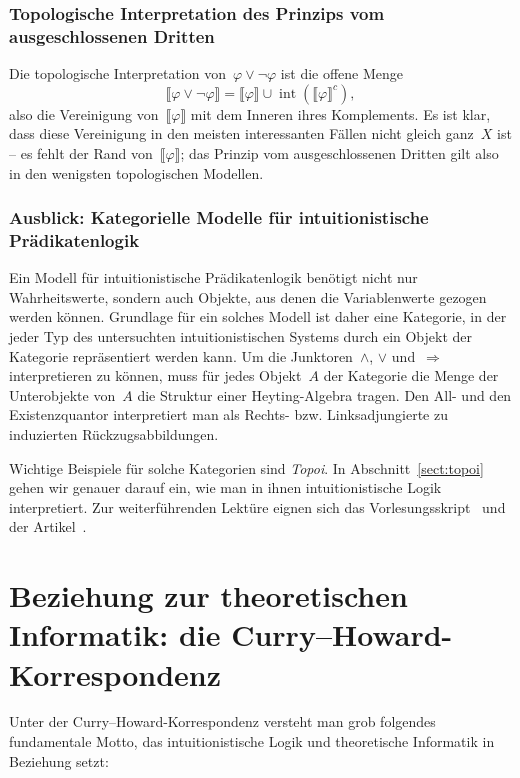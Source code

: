 \documentclass[a4paper,ngerman,12pt]{scrartcl}
\theoremstyle{definition}
\theoremstyle{plain}
\theoremstyle{remark}
\newcommand{\brak}[1]{\llbracket {#1} \rrbracket}
\DeclareMathOperator{\interior}{int}
\renewcommand{\_}{\mathpunct{.}\,}
\newcommand{\?}{\,{:}\,}
\begin{document}
\subsubsection*{Topologische Interpretation des Prinzips vom ausgeschlossenen
Dritten}

Die topologische Interpretation von~$\varphi \vee \neg\varphi$ ist die offene
Menge
\[ \brak{\varphi \vee \neg\varphi} = \brak{\varphi} \cup \interior
(\brak{\varphi}^c), \]
also die Vereinigung von~$\brak{\varphi}$ mit dem Inneren ihres Komplements. Es
ist klar, dass diese Vereinigung in den meisten interessanten Fällen nicht
gleich ganz~$X$ ist -- es fehlt der Rand von~$\brak{\varphi}$; das Prinzip vom
ausgeschlossenen Dritten gilt also in den
wenigsten topologischen Modellen.


\subsubsection*{Ausblick: Kategorielle Modelle für intuitionistische Prädikatenlogik}

Ein Modell für intuitionistische Prädikatenlogik benötigt nicht nur
Wahrheitswerte, sondern auch Objekte, aus denen die Variablenwerte gezogen
werden können. Grundlage für ein solches Modell ist daher eine Kategorie, in der
jeder Typ des untersuchten intuitionistischen Systems durch ein Objekt der
Kategorie repräsentiert werden kann. Um die Junktoren~$\wedge$, $\vee$
und~$\Rightarrow$ interpretieren zu können, muss für jedes Objekt~$A$ der
Kategorie die Menge der Unterobjekte von~$A$ die Struktur einer Heyting-Algebra
tragen. Den All- und den Existenzquantor interpretiert man als Rechts-
bzw. Linksadjungierte zu induzierten Rückzugsabbildungen.

Wichtige Beispiele für solche Kategorien sind \emph{Topoi}. In
Abschnitt~\ref{sect:topoi} gehen wir genauer darauf ein, wie man in ihnen
intuitionistische Logik interpretiert.
Zur weiterführenden Lektüre eignen sich das
Vorlesungsskript~\cite{streicher:ctcl} und der Artikel~\cite{vickers:loctop}.


\section[Beziehung zur theoretischen Informatik: die
Curry--Howard-Korrespondenz]{Beziehung zur theoretischen Informatik: \newline die
Curry--Howard-Korrespondenz}
\label{curry-howard}

Unter der Curry--Howard-Korrespondenz versteht man grob folgendes fundamentale
Motto, das intuitionistische Logik und theoretische Informatik in Beziehung
setzt:
\end{document}
